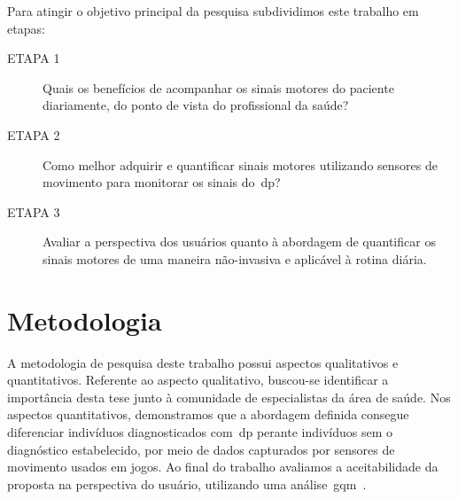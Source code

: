 Para atingir o objetivo principal da pesquisa subdividimos este trabalho em etapas:
	\begin{description}
	\item[ETAPA 1] Quais os benefícios de acompanhar os sinais motores do paciente diariamente, do ponto de vista do profissional da saúde?
	\item[ETAPA 2] Como melhor adquirir e quantificar sinais motores utilizando sensores de movimento para monitorar os sinais do~\ac{dp}?
	\item[ETAPA 3] Avaliar a perspectiva dos usuários quanto à abordagem de quantificar os sinais motores de uma maneira não-invasiva e aplicável à rotina diária.
	\end{description}

\section{Metodologia}
A metodologia de pesquisa deste trabalho possui aspectos qualitativos e quantitativos. Referente ao aspecto qualitativo, buscou-se identificar a importância desta tese junto à comunidade de especialistas da área de saúde. Nos aspectos quantitativos, demonstramos que a abordagem definida consegue diferenciar indivíduos diagnosticados com~\ac{dp} perante indivíduos sem o diagnóstico estabelecido, por meio de dados capturados por sensores de movimento usados em jogos. Ao final do trabalho avaliamos a aceitabilidade da proposta na perspectiva do usuário, utilizando uma análise~\ac{gqm}~\cite{van1999goal}. 

